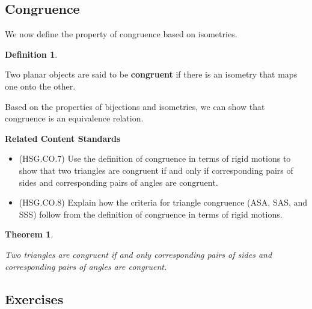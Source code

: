 \documentclass[
]{book}
\providecommand{\tightlist}{%
  \setlength{\itemsep}{0pt}\setlength{\parskip}{0pt}}
\newenvironment{standards}{}{}
\newtheorem{theorem}{Theorem}[chapter]
\theoremstyle{definition}
\newtheorem{definition}{Definition}[chapter]
\theoremstyle{definition}
\theoremstyle{definition}
\theoremstyle{definition}
\theoremstyle{remark}
\begin{document}
\hypertarget{congruence}{%
\subsection{Congruence}\label{congruence}}

We now define the property of congruence based on isometries.

\begin{definition}
\protect\hypertarget{def:unlabeled-div-253}{}\label{def:unlabeled-div-253}

Two planar objects are said to be \textbf{congruent} if there is an isometry that maps one onto the other.

\end{definition}

Based on the properties of bijections and isometries, we can show that congruence is an equivalence relation.

\begin{standards}

\begin{center}
\textbf{Related Content Standards}

\end{center}

\begin{itemize}
\tightlist
\item
  (HSG.CO.7) Use the definition of congruence in terms of rigid motions to show that two triangles are congruent if and only if corresponding pairs of sides and corresponding pairs of angles are congruent.\\
\item
  (HSG.CO.8) Explain how the criteria for triangle congruence (ASA, SAS, and SSS) follow from the definition of congruence in terms of rigid motions.
\end{itemize}

\end{standards}

\begin{theorem}
\protect\hypertarget{thm:unlabeled-div-254}{}\label{thm:unlabeled-div-254}

Two triangles are congruent if and only corresponding pairs of sides and corresponding pairs of angles are congruent.

\end{theorem}

\hypertarget{exercises-50}{%
\subsection{Exercises}\label{exercises-50}}
\end{document}
